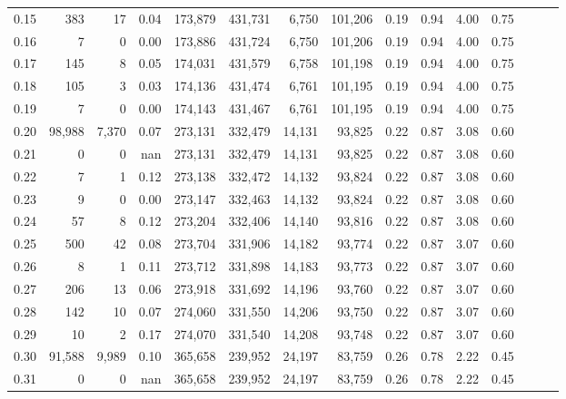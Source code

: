 \begin{tabular}{rrrrrrrrrrrrrrr}
0.15 &     383 &      17 &  0.04 &  173,879 &  431,731 &    6,750 &  101,206 &  0.19 &  0.94 &  4.00 &      0.75 \\
0.16 &       7 &       0 &  0.00 &  173,886 &  431,724 &    6,750 &  101,206 &  0.19 &  0.94 &  4.00 &      0.75 \\
0.17 &     145 &       8 &  0.05 &  174,031 &  431,579 &    6,758 &  101,198 &  0.19 &  0.94 &  4.00 &      0.75 \\
0.18 &     105 &       3 &  0.03 &  174,136 &  431,474 &    6,761 &  101,195 &  0.19 &  0.94 &  4.00 &      0.75 \\
0.19 &       7 &       0 &  0.00 &  174,143 &  431,467 &    6,761 &  101,195 &  0.19 &  0.94 &  4.00 &      0.75 \\
0.20 &  98,988 &   7,370 &  0.07 &  273,131 &  332,479 &   14,131 &   93,825 &  0.22 &  0.87 &  3.08 &      0.60 \\
0.21 &       0 &       0 &   nan &  273,131 &  332,479 &   14,131 &   93,825 &  0.22 &  0.87 &  3.08 &      0.60 \\
0.22 &       7 &       1 &  0.12 &  273,138 &  332,472 &   14,132 &   93,824 &  0.22 &  0.87 &  3.08 &      0.60 \\
0.23 &       9 &       0 &  0.00 &  273,147 &  332,463 &   14,132 &   93,824 &  0.22 &  0.87 &  3.08 &      0.60 \\
0.24 &      57 &       8 &  0.12 &  273,204 &  332,406 &   14,140 &   93,816 &  0.22 &  0.87 &  3.08 &      0.60 \\
0.25 &     500 &      42 &  0.08 &  273,704 &  331,906 &   14,182 &   93,774 &  0.22 &  0.87 &  3.07 &      0.60 \\
0.26 &       8 &       1 &  0.11 &  273,712 &  331,898 &   14,183 &   93,773 &  0.22 &  0.87 &  3.07 &      0.60 \\
0.27 &     206 &      13 &  0.06 &  273,918 &  331,692 &   14,196 &   93,760 &  0.22 &  0.87 &  3.07 &      0.60 \\
0.28 &     142 &      10 &  0.07 &  274,060 &  331,550 &   14,206 &   93,750 &  0.22 &  0.87 &  3.07 &      0.60 \\
0.29 &      10 &       2 &  0.17 &  274,070 &  331,540 &   14,208 &   93,748 &  0.22 &  0.87 &  3.07 &      0.60 \\
0.30 &  91,588 &   9,989 &  0.10 &  365,658 &  239,952 &   24,197 &   83,759 &  0.26 &  0.78 &  2.22 &      0.45 \\
0.31 &       0 &       0 &   nan &  365,658 &  239,952 &   24,197 &   83,759 &  0.26 &  0.78 &  2.22 &      0.45 \\

\end{tabular}
